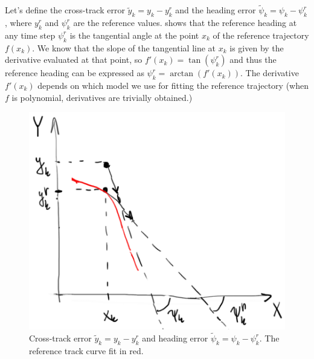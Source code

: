 \documentclass[a4paper]{article}
\begin{document}
Let's define the cross-track error \( \tilde{y}_k = y_k - y^r_k \) and the heading error \( \tilde{\psi}_k = \psi_k - \psi^r_k \), where \( y^r_k \) and \( \psi^r_k \) are the reference values.
 shows that the reference heading at any time step \( \psi^r_k \) is the tangential angle at the point \( x_k \) of the reference trajectory \( f(x_k) \).
We know that the slope of the tangential line at \( x_k \) is given by the derivative evaluated at that point, so \( f'(x_k) = \tan(\psi^r_k) \) and thus the reference heading can be expressed as \( \psi^r_k = \arctan( f'(x_k) ) \).
The derivative \( f'(x_k) \) depends on which model we use for fitting the reference trajectory (when \( f \) is polynomial, derivatives are trivially obtained.)
\begin{figure}[h]
	\centering
	\includegraphics[width=0.5\columnwidth]{./img/errors.png}
	\caption{Cross-track error \( \tilde{y}_k = y_k - y^r_k \) and heading error \( \tilde{\psi}_k = \psi_k - \psi^r_k \). The reference track curve fit in red.}
	\label{fig:errors}
\end{figure}
\end{document}
